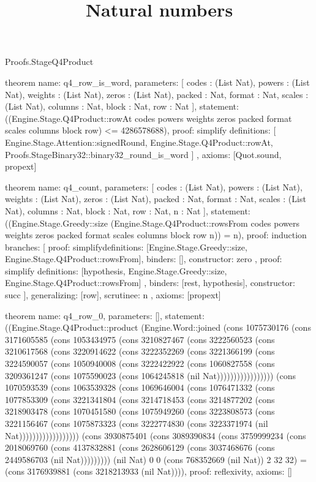 \begin{lexlean}{Proofs.StageQ4Product}
\title{Natural numbers}
\begin{semanticmodule}
theorem{
  name: q4_row_is_word,
  parameters: [
    codes : (List Nat),
    powers : (List Nat),
    weights : (List Nat),
    zeros : (List Nat),
    packed : Nat,
    format : Nat,
    scales : (List Nat),
    columns : Nat,
    block : Nat,
    row : Nat
  ],
  statement: ((Engine.Stage.Q4Product::rowAt codes powers weights zeros packed format scales columns block row) <= 4286578688),
  proof: simplify{
    definitions: [
      Engine.Stage.Attention::signedRound,
      Engine.Stage.Q4Product::rowAt,
      Proofs.StageBinary32::binary32_round_is_word
    ]
  },
  axioms: [Quot.sound, propext]
}

theorem{
  name: q4_count,
  parameters: [
    codes : (List Nat),
    powers : (List Nat),
    weights : (List Nat),
    zeros : (List Nat),
    packed : Nat,
    format : Nat,
    scales : (List Nat),
    columns : Nat,
    block : Nat,
    row : Nat,
    n : Nat
  ],
  statement: ((Engine.Stage.Greedy::size (Engine.Stage.Q4Product::rowsFrom codes powers weights zeros packed format scales columns block row n)) = n),
  proof: induction{
    branches: [
      {
        proof: simplify{definitions: [Engine.Stage.Greedy::size, Engine.Stage.Q4Product::rowsFrom]},
        binders: [],
        constructor: zero
      },
      {
        proof: simplify{
          definitions: [hypothesis, Engine.Stage.Greedy::size, Engine.Stage.Q4Product::rowsFrom]
        },
        binders: [rest, hypothesis],
        constructor: succ
      }
    ],
    generalizing: [row],
    scrutinee: n
  },
  axioms: [propext]
}

theorem{
  name: q4_row_0,
  parameters: [],
  statement: ((Engine.Stage.Q4Product::product (Engine.Word::joined (cons 1075730176 (cons 3171605585 (cons 1053434975 (cons 3210827467 (cons 3222560523 (cons 3210617568 (cons 3220914622 (cons 3222352269 (cons 3221366199 (cons 3224590057 (cons 1050940008 (cons 3222422922 (cons 1060827558 (cons 3209361247 (cons 1075590023 (cons 1064245818 (nil Nat))))))))))))))))) (cons 1070593539 (cons 1063539328 (cons 1069646004 (cons 1076471332 (cons 1077853309 (cons 3221341804 (cons 3214718453 (cons 3214877202 (cons 3218903478 (cons 1070451580 (cons 1075949260 (cons 3223808573 (cons 3221156467 (cons 1075873323 (cons 3222774830 (cons 3223371974 (nil Nat)))))))))))))))))) (cons 3930875401 (cons 3089390834 (cons 3759999234 (cons 2018069760 (cons 4137832881 (cons 2628606129 (cons 3037468676 (cons 2449586703 (nil Nat))))))))) (nil Nat) 0 0 (cons 768352669 (nil Nat)) 2 32 32) = (cons 3176939881 (cons 3218213933 (nil Nat)))),
  proof: reflexivity{},
  axioms: []
}


\end{semanticmodule}
\end{lexlean}
